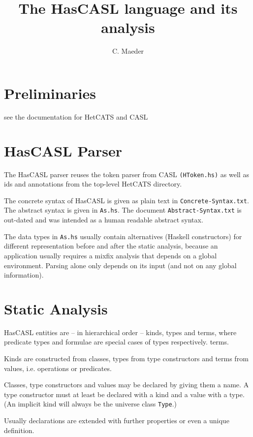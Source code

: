 \documentclass{article}
\begin{document}
\title{The HasCASL language and its analysis}

\author{C. Maeder}

\maketitle

\section{Preliminaries}

see the documentation for HetCATS and CASL

\section{HasCASL Parser}
The HasCASL parser reuses the token parser from CASL \texttt{(HToken.hs)} as
well as ids and annotations from the top-level HetCATS directory.

The concrete syntax of HasCASL is given as plain text in
\texttt{Concrete-Syntax.txt}. The abstract syntax is given in
\texttt{As.hs}. The document \texttt{Abstract-Syntax.txt} is out-dated and was
intended as a human readable abstract syntax.

The data types in \texttt{As.hs} usually contain alternatives (Haskell
constructors) for different representation before and after the static
analysis, because an application usually requires a mixfix analysis that
depends on a global environment. Parsing alone only depends on its input
(and not on any global information).

\section{Static Analysis}

HasCASL entities are -- in hierarchical
order -- kinds, types and terms, where predicate types and formulae are
special cases of types respectively. terms.

Kinds are constructed from classes, types from type
constructors and terms from values, i.e. operations or predicates.

Classes, type constructors and values may be declared by giving them a name.
A type constructor must at least be declared with a kind and a value with a
type. (An implicit kind will always be the universe class \texttt{Type}.)

Usually declarations are extended with further properties or even a unique
definition.
\end{document}
